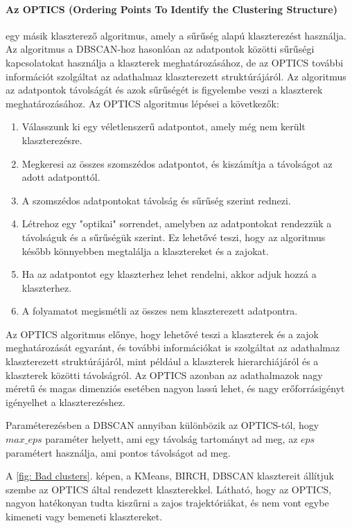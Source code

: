 \documentclass[acmtog, authorversion]{acmart}
\begin{document}
\paragraph{Az OPTICS (Ordering Points To Identify the Clustering Structure)} egy másik klaszterező algoritmus, amely a sűrűség alapú klaszterezést használja. Az algoritmus a DBSCAN-hoz hasonlóan az adatpontok közötti sűrűségi kapcsolatokat használja a klaszterek meghatározásához, de az OPTICS további információt szolgáltat az adathalmaz klaszterezett struktúrájáról. Az algoritmus az adatpontok távolságát és azok sűrűségét is figyelembe veszi a klaszterek meghatározásához.
Az OPTICS algoritmus lépései a következők:
\begin{enumerate}
    \item Válasszunk ki egy véletlenszerű adatpontot, amely még nem került klaszterezésre.
    \item Megkeresi az összes szomszédos adatpontot, és kiszámítja a távolságot az adott adatponttól.
    \item A szomszédos adatpontokat távolság és sűrűség szerint rednezi.
    \item Létrehoz egy "optikai" sorrendet, amelyben az adatpontokat rendezzük a távolságuk és a sűrűségük szerint. Ez lehetővé teszi, hogy az algoritmus később könnyebben megtalálja a klasztereket és a zajokat.
    \item Ha az adatpontot egy klaszterhez lehet rendelni, akkor adjuk hozzá a klaszterhez.
    \item A folyamatot megismétli az összes nem klaszterezett adatpontra.
\end{enumerate}
Az OPTICS algoritmus előnye, hogy lehetővé teszi a klaszterek és a zajok meghatározását egyaránt, és további információkat is szolgáltat az adathalmaz klaszterezett struktúrájáról, mint például a klaszterek hierarchiájáról és a klaszterek közötti távolságról. Az OPTICS azonban az adathalmazok nagy méretű és magas dimenziós esetében nagyon lassú lehet, és nagy erőforrásigényt igényelhet a klaszterezéshez.

Paraméterezésben a DBSCAN annyiban különbözik az OPTICS-tól, hogy $max\_eps$ paraméter helyett, ami egy távolság tartományt ad meg, az $eps$ paramétert használja, ami pontos távolságot ad meg.

A \ref{fig: Bad clusters}. képen, a KMeans, BIRCH, DBSCAN klasztereit állítjuk szembe az OPTICS által rendezett klaszterekkel. Látható, hogy az OPTICS, nagyon hatékonyan tudta kiszűrni a zajos trajektóriákat, és nem vont egybe kimeneti vagy bemeneti klasztereket.
\end{document}
